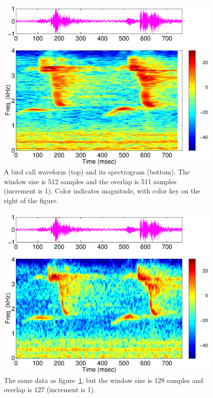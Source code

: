 \begin{figure}[p]
\centerline{\includegraphics[height=0.35\textheight]{ch-fft/ufft_cardinal1_spg512_511}}
\caption[A bird call waveform and its spectrogram]{A bird call
waveform (top) and its spectrogram (bottom). The window size is 512
samples and the overlap is 511 samples (increment is 1). Color
indicates magnitude, with color key on the right of the
figure.\label{fig:ufft-birdspg-c1}}
\end{figure}

\begin{figure}
\centerline{\includegraphics[height=0.35\textheight]{ch-fft/ufft_cardinal1_spg128_127}}
\caption[Same data as figure~\ref{fig:ufft-birdspg-c1};
window size 128 samples, overlap 127]{The same data as
figure~\ref{fig:ufft-birdspg-c1}, but the window size is 128 samples
and overlap is 127 (increment is 1).\label{fig:ufft-birdspg-c2}}
\end{figure}

